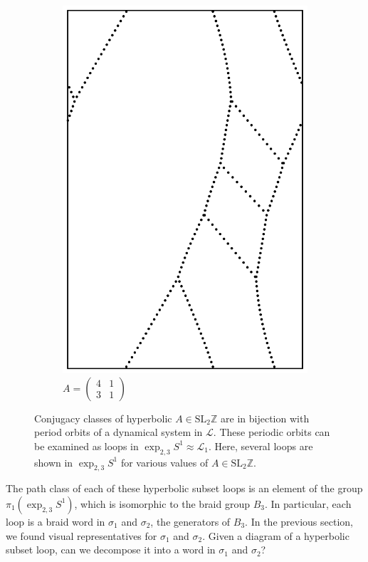 \documentclass[12pt,twoside]{reedthesis}
\theoremstyle{definition}
\newcommand{\Z}{\mathbb{Z}}
\newcommand{\LS}{\mathcal{L}}
\newcommand{\SLZ}{\mathrm{SL}_2{\Z}}
\begin{document}
\begin{figure}[h]
\begin{subfigure}[t]{0.31\textwidth}
    \includegraphics[width=\textwidth]{figures/subset_loop_pqqq_4_1_3_1.pdf}
    \caption*{$A = \begin{pmatrix}4 & 1 \\ 3 & 1\end{pmatrix}$}
  \end{subfigure}
  \caption{Conjugacy classes of hyperbolic $A \in \SLZ$ are in bijection with period orbits of a dynamical system in $\LS$. These periodic orbits can be examined as loops in $\exp_{2,3} S^1 \approx \LS_1$. Here, several loops are shown in $\exp_{2,3} S^1$ for various values of $A \in \SLZ$.}
  \label{fig:subset_loop_examples}
\end{figure}

The path class of each of these hyperbolic subset loops is an element of the group $\pi_1(\exp_{2,3} S^1)$, which is isomorphic to the braid group $B_3$.
In particular, each loop is a braid word in $\sigma_1$ and $\sigma_2$, the generators of $B_3$.
In the previous section, we found visual representatives for $\sigma_1$ and $\sigma_2$.
Given a diagram of a hyperbolic subset loop, can we decompose it into a word in $\sigma_1$ and $\sigma_2$?
\end{document}
